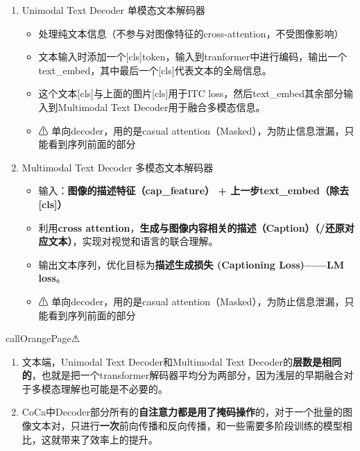 \documentclass[zihao=false,fontset=windows]{ctexart}
\newcommand{\feiEmoji}[1]{{\emojifont #1}}
\newcommand{\feiCirc}{\textcolor{feishuBlue}{◦}}
\newcommand{\feiDot}{\textcolor{feishuBlue}{\textbullet}}
\begin{document}
\begin{enumerate}
\begin{itemize}[label=\feiCirc, leftmargin=1.45em]
\begin{feishuquotenb}
\begin{itemize}[label=\feiDot, leftmargin=1.35em]
con\_feature = attentional\_pooling(img\_feature, con\_query)
\item 对于\textcolor{feishuRed}{\textbf{生成任务}}，采用\textbf{维度为256的query}进行attention，将img\_embed生成\textbf{更多的视觉tokens表示更多精细的细节}，以此和文本特征进行多模态融合。\par
cap\_feature = attentional\_pooling(img\_feature, cap\_query)
\end{itemize}
\end{feishuquotenb}
\end{itemize}

\item Unimodal Text Decoder 单模态文本解码器
\begin{itemize}[label=\feiCirc, leftmargin=1.45em]
\item 处理纯文本信息（不参与对图像特征的cross-attention，不受图像影响）
\item 文本输入时添加一个[cls]token，输入到tranformer中进行编码，输出一个text\_embed，其中最后一个[cls]代表文本的全局信息。
\item 这个文本[cls]与上面的图片[cls]用于ITC loss，然后text\_embed其余部分输入到Multimodal Text Decoder用于融合多模态信息。
\item \feiEmoji{⚠} 单向decoder，用的是casual attention（Masked），为防止信息泄漏，只能看到序列前面的部分
\end{itemize}

\item Multimodal Text Decoder 多模态文本解码器
\begin{itemize}[label=\feiCirc, leftmargin=1.45em]
\item 输入：\textbf{图像的描述特征（cap\_feature） + 上一步text\_embed（除去[cls]）}
\item 利用\textbf{cross attention}，\textbf{生成与图像内容相关的描述（Caption）（/还原对应文本）}，实现对视觉和语言的联合理解。
\item 输出文本序列，优化目标为\textbf{描述生成损失 (Captioning Loss)——LM loss}。
\item \feiEmoji{⚠} 单向decoder，用的是casual attention（Masked），为防止信息泄漏，只能看到序列前面的部分
\end{itemize}
\end{enumerate}

\begin{feishubox}{callOrangePage}{⚠}
\begin{enumerate}
\item 文本端，Unimodal Text Decoder和Multimodal Text Decoder的\textbf{层数是相同的}，也就是把一个transformer解码器平均分为两部分，因为浅层的早期融合对于多模态理解也可能是不必要的。
\item CoCa中Decoder部分所有的\textbf{自注意力都是用了掩码操作}的，对于一个批量的图像文本对，只进行\textcolor{feishuRed}{\textbf{一次}}前向传播和反向传播，和一些需要多阶段训练的模型相比，这就带来了效率上的提升。
\end{enumerate}
\end{feishubox}
\end{document}
